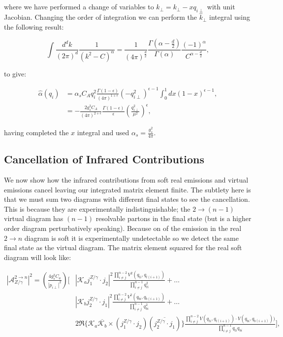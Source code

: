 		where we have performed a change of variables to $\hat{k}_\perp = k_\perp - xq_{i\perp}$ with
		unit Jacobian.  Changing the order of integration we can perform the $\hat{k}_\perp$ integral
		using the following result:

		\begin{equation}
			\int \frac{d^dk}{(2\pi)^d}\frac{1}{(k^2 - C)^\alpha} = \frac{1}{(4\pi)^{\frac{d}{2}}}
				\frac{\Gamma(\alpha - \frac{d}{2})}{\Gamma(\alpha)}\frac{(-1)^\alpha}{C^{\alpha - \frac{d}{2}}},
		\end{equation}

		to give:

		\begin{align}
			\hat{\alpha}(q_i) &= \alpha_sC_Aq_i^2\frac{\Gamma(1-\epsilon)}{(4\pi)^{1+\epsilon}}(-q_{i\perp}^2)^{\epsilon-1}
				\int_0^1 dx(1-x)^{\epsilon-1}, \\
				&= -\frac{2g_s^2C_A}{(4\pi)^{2+\epsilon}}\frac{\Gamma(1-\epsilon)}{\epsilon}\left(\frac{q_{i\perp}^2}{\mu^2}\right)^\epsilon,
		\end{align}

		having completed the $x$ integral and used $\alpha_s=\frac{g_s^2}{4\pi}$.

	\subsection{Cancellation of Infrared Contributions}
		\label{sub:subsection_name}

		We now show how the infrared contributions from soft real emissions and virtual emissions cancel leaving
		our integrated matrix element finite.  The subtlety here is that we must sum two diagrams with different
		final states to see the cancellation.  This is because they are experimentally indistinguishable;
		the $2\rightarrow (n-1)$ virtual diagram has $(n-1)$ resolvable partons in the final state (but is a
		higher order diagram perturbatively speaking).  Because on of the emission in the real $2\rightarrow n$
		diagram is soft it is experimentally undetectable so we detect the same final state as the virtual diagram.
		The matrix element squared for the real soft diagram will look like:

		\begin{align}
			|\mathcal{A}_{Z/\gamma}^{2\rightarrow n}|^2 = \left(\frac{4g_s^2C_a}{|p_{i\perp}|^2}\right)
				\Bigg[&\left|\mathcal{K}_a j_1^{Z/\gamma}\cdot j_2\right|^2 \frac{\prod^{n-2}_{i\neq j}V^2(q_{ti},
				q_{t(i+1)})}{\prod^{n-1}_{i\neq j}q^2_{ti}} + \ldots \\&\left|\mathcal{K}_b j_2^{Z/\gamma}\cdot j_1\right|^2
				\frac{\prod^{n-2}_{i\neq j}V^2(q_{bi}, q_{b(i+1)})}{\prod^{n-1}_{i\neq j}q^2_{bi}} + \ldots \\
				&2\Re\{\mathcal{K}_a\overline{\mathcal{K}_b} \times (j_1^{Z/\gamma}\cdot j_2)(\overline{j_2^{Z/\gamma}\cdot j_1})\}
				\frac{\prod^{n-2}_{i\neq j}V(q_{ti}, q_{t(i+1)})\cdot V(q_{bi}, q_{b(i+1)}))}{\prod^{n-1}_{i\neq j}q_{ti}q_{bi}}\Bigg],
		\end{align}

